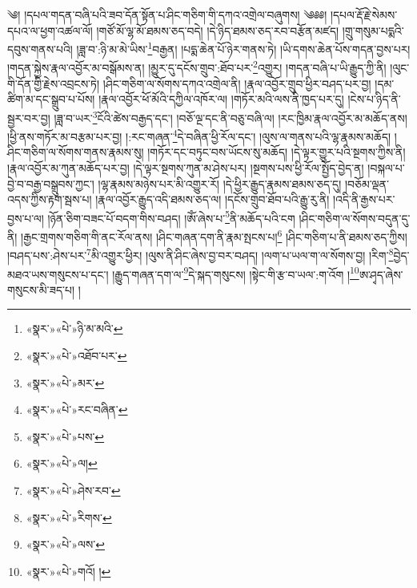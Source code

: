 ༄། །དཔལ་གདན་བཞི་པའི་ཟབ་དོན་སྟོན་པ་ཤིང་གཅིག་གི་དཀའ་འགྲེལ་བཞུགས། ༄༅༅། །དཔལ་རྡོ་རྗེ་སེམས་དཔའ་ལ་ཕྱག་འཚལ་ལོ། །གཙོ་མོ་ལྷ་མོ་ཐམས་ཅད་བདེ། །དེ་ཉིད་ཐམས་ཅད་རབ་བརྩོན་མཛད། །གྲུ་གསུམ་པདྨའི་དབུས་གནས་པའི། །ཟླ་བ་:ཉི་མ་མེ་ཡིས་\footnote{«སྣར་»«པེ་»ཉི་མ་མའི་}བརྒྱན། །པདྨ་ཆེན་པོ་ཉེར་གནས་ཏེ། །ཡི་དགས་ཆེན་པོས་གདན་བྱས་པར། །གདན་སྐྱེས་རྣལ་འབྱོར་མ་བསྒོམས་ན། །མྱུར་དུ་དངོས་གྲུབ་:ཐོབ་པར་\footnote{«སྣར་»«པེ་»འཐོབ་པར་}འགྱུར། །གདན་བཞི་པ་ཡི་རྒྱུད་ཀྱི་ནི། །ལུང་གི་དོན་གྱི་རྗེས་འབྲངས་ཏེ། །ཤིང་གཅིག་ལ་སོགས་དཀའ་འགྲེལ་ནི། །རྣལ་འབྱོར་གྲུབ་ཕྱིར་བཤད་པར་བྱ། །དམ་ཚིག་མ་དང་སྒྲུབ་པ་པོས། །རྣལ་འབྱོར་ཕོ་མོའི་དཀྱིལ་འཁོར་ལ། །གཏོར་མའི་ལས་ནི་ཁྱད་པར་དུ། །ངེས་པ་ཉིད་ནི་སྦྱར་བར་བྱ། །ཟླ་བ་ཡར་\footnote{«སྣར་»«པེ་»མར་}ངོའི་ཚེས་བརྒྱད་དང་། །བཅོ་ལྔ་དང་ནི་བཅུ་བཞི་ལ། །རང་ཁྱིམ་རྣལ་འབྱོར་མ་མཆོད་ནས། །ཕྱི་ནས་གཏོར་མ་བརྩམ་པར་བྱ། །:རང་གཞན་\footnote{«སྣར་»«པེ་»རང་བཞིན་}དེ་བཞིན་ཕྱི་རོལ་དང་། །ལུས་ལ་གནས་པའི་ལྷ་རྣམས་མཆོད། །ཤིང་གཅིག་ལ་སོགས་གནས་རྣམས་སུ། །གཏོར་དང་བཏུང་བས་ཡོངས་སུ་མཆོད། །དེ་ལྟར་གྱུར་པའི་སྔགས་ཀྱིས་ནི། །རྣལ་འབྱོར་མ་ཀུན་མཆོད་པར་བྱ། །དེ་ལྟར་སྔགས་ཀུན་མ་ཤེས་པར། །སྔགས་པས་ཕྱི་རོལ་སྤྱོད་བྱེད་ན། །བསྐལ་པ་བྱེ་བ་བརྒྱ་བསྒྲུབས་ཀྱང་། །ལྷ་རྣམས་མཉེས་པར་མི་འགྱུར་རོ། །དེ་ཕྱིར་རྒྱུད་རྣམས་ཐམས་ཅད་དུ། །བཅོམ་ལྡན་འདས་ཀྱིས་རྟག་སྦས་པ། །རྣལ་འབྱོར་རྒྱུད་འདི་ཐམས་ཅད་ལ། །དངོས་གྲུབ་ཐོབ་པའི་རྒྱུ་རུ་ནི། །འདི་ནི་རྒྱས་པར་བྱས་པ་ལ། །ཉོན་ཅིག་བཟང་པོ་བདག་གིས་བཤད། །ཨོཾ་ཞེས་པ་\footnote{«སྣར་»«པེ་»པས་}ནི་མཆོད་པའི་ངག །ཤིང་གཅིག་ལ་སོགས་བདུན་དུ་ནི། །རྒྱང་གྲགས་གཅིག་གི་ནང་རོལ་ནས། །ཤིང་གཞན་དག་ནི་རྣམ་སྤངས་པ།\footnote{«སྣར་»«པེ་»ལ།} །ཤིང་གཅིག་པ་ནི་ཐམས་ཅད་ཀྱིས། །བཤད་པས་:ཤེས་པར་\footnote{«སྣར་»«པེ་»ཤེས་རབ་}མི་འགྱུར་ཕྱིར། །ལུས་ནི་ཤིང་ཞེས་བྱ་བར་བཤད། །ལག་པ་ཡལ་ག་ལ་སོགས་བྱ། །རིག་\footnote{«སྣར་»«པེ་»རིགས་}བྱེད་མཐའ་ཡས་གསུངས་པ་དང་། །རྒྱུད་གཞན་དག་ལ་\footnote{«སྣར་»«པེ་»ལས་}དེ་སྐད་གསུངས། །སྟེང་གི་རྩ་བ་ཡལ་:ག་འོག །\footnote{«སྣར་»«པེ་»གའོ། །}ཨ་ཤྭད་ཞེས་གསུངས་མི་ཟད་པ། །
